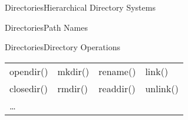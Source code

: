 \begin{frame}{Directories}{Hierarchical Directory Systems}
  \begin{center}
  \end{center}
\end{frame}

\begin{frame}{Directories}{Path Names}
  \begin{center}
  \end{center}
\end{frame}

\begin{frame}{Directories}{Directory Operations}
  \begin{center}\ttfamily
    \begin{tabular}{llll}
      opendir()&mkdir()&rename()&link()\\
      closedir()&rmdir()&readdir()&unlink()\\
      \ldots&&&
    \end{tabular}
  \end{center}
\end{frame}

